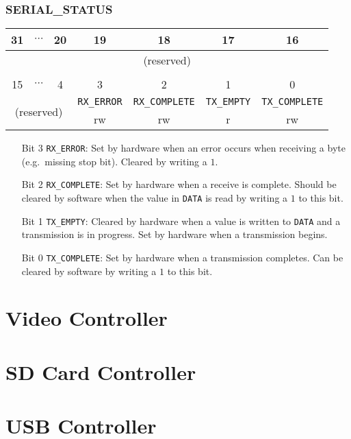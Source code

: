 \documentclass[11pt,openany]{report}
\begin{document}
\subsubsection{SERIAL\_STATUS}
\begin{center}
  \begin{tabular}{|c|c|c|c|c|c|c|}
    \hline
    31 & $\cdots$ & 20 & 19 & 18 & 17 & 16  \\
    \hline
    \multicolumn{7}{|c|}{\multirow{2}{*}{(reserved)}}\\
    \multicolumn{7}{|c|}{}\\
    \hline
    \multicolumn{7}{c}{}\\
    \hline
    15 & $\cdots$ & 4 & 3 & 2 & 1 & 0 \\
    \hline
    \multicolumn{3}{|c|}{\multirow{2}{*}{(reserved)}} & \texttt{RX\_ERROR} & \texttt{RX\_COMPLETE} & \texttt{TX\_EMPTY} & \texttt{TX\_COMPLETE} \\
    \cline{4-7}
    \multicolumn{3}{|c|}{} & rw & rw & r & rw\\
    \hline
  \end{tabular}
\end{center}

\begin{enumerate}
\item[Bit 3] \verb|RX_ERROR|: Set by hardware when an error occurs
  when receiving a byte (e.g.\ missing stop bit). Cleared by writing a $1$.
\item[Bit 2] \verb|RX_COMPLETE|: Set by hardware when a receive is
  complete. Should be cleared by software when the value in
  \verb|DATA| is read by writing a $1$ to this bit.
\item[Bit 1] \verb|TX_EMPTY|: Cleared by hardware when a value is
  written to \verb|DATA| and a transmission is in progress. Set by
  hardware when a transmission begins.
\item[Bit 0] \verb|TX_COMPLETE|: Set by hardware when a transmission
  completes. Can be cleared by software by writing a $1$ to this bit.
\end{enumerate}


\section{Video Controller}

\section{SD Card Controller}

\section{USB Controller}
\end{document}
